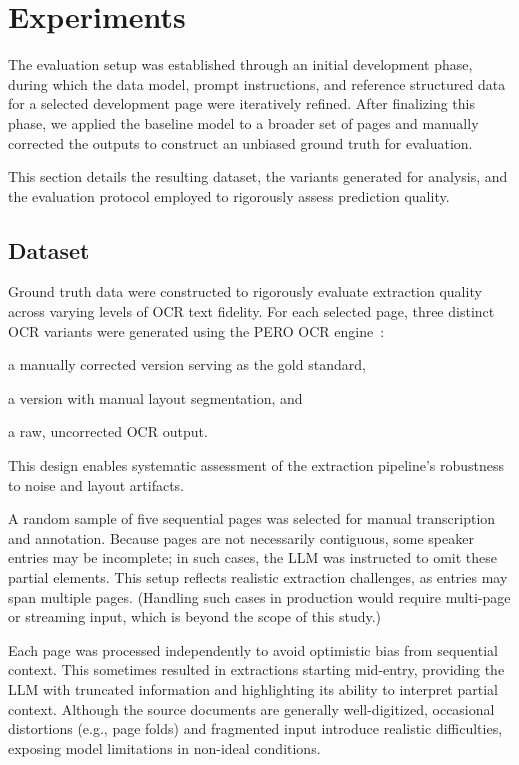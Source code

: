 \section{Experiments}
\label{sec:experiments}
The evaluation setup was established through an initial development phase, during which the data model, prompt instructions, and reference structured data for a selected development page were iteratively refined. After finalizing this phase, we applied the baseline model to a broader set of pages and manually corrected the outputs to construct an unbiased ground truth for evaluation.

This section details the resulting dataset, the variants generated for analysis, and the evaluation protocol employed to rigorously assess prediction quality.


\subsection{Dataset}
\label{sec:xp-dataset}

Ground truth data were constructed to rigorously evaluate extraction quality across varying levels of OCR text fidelity. For each selected page, three distinct OCR variants were generated using the PERO OCR engine~\cite{kis2021atst,kodym2021layout,kohut2021tsnet}:
\begin{inparaenum}[(1)] 
    \item a manually corrected version serving as the gold standard, 
    \item a version with manual layout segmentation, and 
    \item a raw, uncorrected OCR output.
\end{inparaenum}
This design enables systematic assessment of the extraction pipeline’s robustness to noise and layout artifacts.

A random sample of five sequential pages was selected for manual transcription and annotation. Because pages are not necessarily contiguous, some speaker entries may be incomplete; in such cases, the LLM was instructed to omit these partial elements. This setup reflects realistic extraction challenges, as entries may span multiple pages. (Handling such cases in production would require multi-page or streaming input, which is beyond the scope of this study.)

Each page was processed independently to avoid optimistic bias from sequential context. This sometimes resulted in extractions starting mid-entry, providing the LLM with truncated information and highlighting its ability to interpret partial context. Although the source documents are generally well-digitized, occasional distortions (e.g., page folds) and fragmented input introduce realistic difficulties, exposing model limitations in non-ideal conditions.

